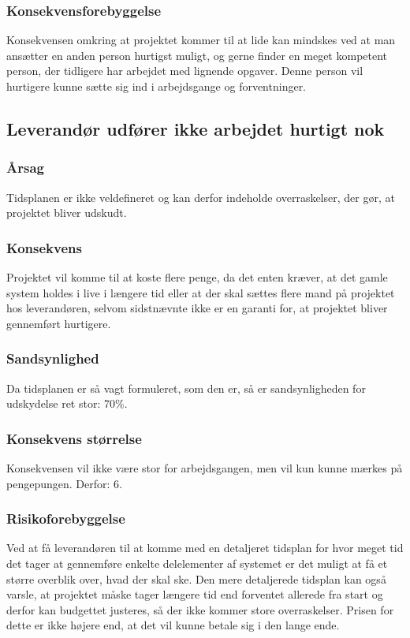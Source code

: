 \documentclass[10pt,a4paper,danish]{article}
\begin{document}
\subsubsection{Konsekvensforebyggelse}
Konsekvensen omkring at projektet kommer til at lide kan mindskes ved at man ansætter en anden person hurtigst muligt, og gerne finder en meget kompetent person, der tidligere har arbejdet med lignende opgaver. Denne person vil hurtigere kunne sætte sig ind i arbejdsgange og forventninger.


\subsection{Leverandør udfører ikke arbejdet hurtigt nok}
\subsubsection{Årsag}
Tidsplanen er ikke veldefineret og kan derfor indeholde overraskelser, der gør, at projektet bliver udskudt.

\subsubsection{Konsekvens}
Projektet vil komme til at koste flere penge, da det enten kræver, at det gamle system holdes i live i længere tid eller at der skal sættes flere mand på projektet hos leverandøren, selvom sidstnævnte ikke er en garanti for, at projektet bliver gennemført hurtigere.

\subsubsection{Sandsynlighed}
Da tidsplanen er så vagt formuleret, som den er, så er sandsynligheden for udskydelse ret stor: 70\%.

\subsubsection{Konsekvens størrelse}
Konsekvensen vil ikke være stor for arbejdsgangen, men vil kun kunne mærkes på pengepungen. Derfor: 6.

\subsubsection{Risikoforebyggelse}
Ved at få leverandøren til at komme med en detaljeret tidsplan for hvor meget tid det tager at gennemføre enkelte delelementer af systemet er det muligt at få et større overblik over, hvad der skal ske.
Den mere detaljerede tidsplan kan også varsle, at projektet måske tager længere tid end forventet allerede fra start og derfor kan budgettet justeres, så der ikke kommer store overraskelser.
Prisen for dette er ikke højere end, at det vil kunne betale sig i den lange ende.
\end{document}
